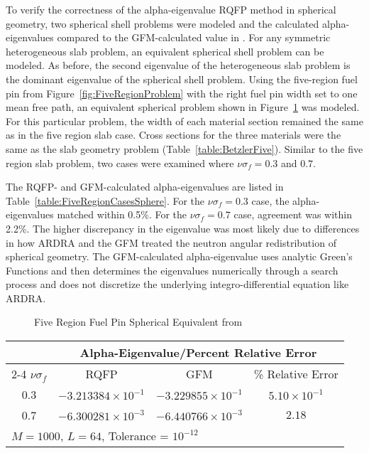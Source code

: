 To verify the correctness of the alpha-eigenvalue RQFP method in spherical geometry, two spherical shell problems were modeled and the calculated alpha-eigenvalues compared to the GFM-calculated value in \cite{kornreich_greens_1997}. For any symmetric heterogeneous slab problem, an equivalent spherical shell problem can be modeled. As before, the second eigenvalue of the heterogeneous slab problem is the dominant eigenvalue of the spherical shell problem. Using the five-region fuel pin from Figure~\ref{fig:FiveRegionProblem} with the right fuel pin width set to one mean free path, an equivalent spherical problem shown in Figure~\ref{fig:FiveRegionSphereProblem} was modeled. For this particular problem, the width of each material section remained the same as in the five region slab case. Cross sections for the three materials were the same as the slab geometry problem (Table~\ref{table:BetzlerFive}). Similar to the five region slab problem, two cases were examined where $\nu \sigma_{f} = 0.3$ and $0.7$.

The RQFP- and GFM-calculated alpha-eigenvalues are listed in Table~\ref{table:FiveRegionCasesSphere}. For the $\nu \sigma_{f} = 0.3$ case, the alpha-eigenvalues matched within 0.5\%. For the $\nu \sigma_{f} = 0.7 $ case, agreement was within 2.2\%. The higher discrepancy in the eigenvalue was most likely due to differences in how ARDRA and the GFM treated the neutron angular redistribution of spherical geometry. The GFM-calculated alpha-eigenvalue uses analytic Green's Functions and then determines the eigenvalues numerically through a search process and does not discretize the underlying integro-differential equation like ARDRA.

\begin{figure}[!htbp]
	\centering
	
	\caption{Five Region Fuel Pin Spherical Equivalent from \cite{kornreich_timeeigenvalue_2005}}
	\label{fig:FiveRegionSphereProblem}
\end{figure}

\begin{table*}[!htbp]
\centering{}
\caption{Comparison of RQFP- and GFM-calculated Alpha-Eigenvalues for a Three Region Multiplying Sphere}
\label{table:FiveRegionCasesSphere}
\begin{tabular}{@{}cccc@{}}\toprule
& \multicolumn{3}{c}{Alpha-Eigenvalue/Percent Relative Error} \\
\cmidrule{2-4} $\nu \sigma_{f}$ & RQFP & GFM & \% Relative Error \\
\midrule
0.3 & $-3.213384 \times 10^{-1}$ & $-3.229855 \times 10^{-1}$ & $5.10 \times 10^{-1}$ \\ 
0.7 & $-6.300281 \times 10^{-3}$ & $-6.440766 \times 10^{-3}$ & $2.18$ \\ 
\bottomrule
\multicolumn{4}{l}{$M = 1000$, $L = 64$, Tolerance = $10^{-12}$} \\
\end{tabular}
\end{table*}

